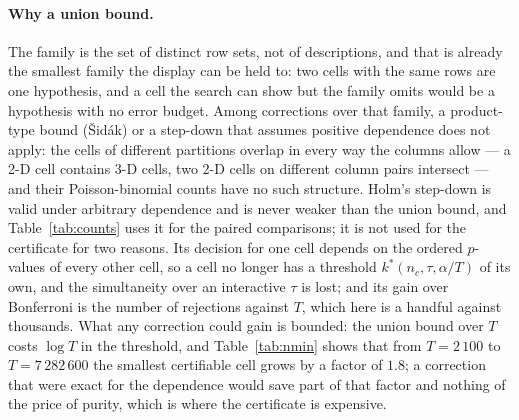 \documentclass[11pt]{article}
\begin{document}
\paragraph{Why a union bound.} The family is the set of distinct row sets, not of descriptions, and that is already the smallest family the display can be held to: two cells with the same rows are one hypothesis, and a cell the search can show but the family omits would be a hypothesis with no error budget. Among corrections over that family, a product-type bound (\v{S}id\'ak) or a step-down that assumes positive dependence does not apply: the cells of different partitions overlap in every way the columns allow --- a 2-D cell contains 3-D cells, two 2-D cells on different column pairs intersect --- and their Poisson-binomial counts have no such structure. Holm's step-down is valid under arbitrary dependence and is never weaker than the union bound, and Table~\ref{tab:counts} uses it for the paired comparisons; it is not used for the certificate for two reasons. Its decision for one cell depends on the ordered $p$-values of every other cell, so a cell no longer has a threshold $k^*(n_c,\tau,\alpha/T)$ of its own, and the simultaneity over an interactive $\tau$ is lost; and its gain over Bonferroni is the number of rejections against $T$, which here is a handful against thousands. What any correction could gain is bounded: the union bound over $T$ costs $\log T$ in the threshold, and Table~\ref{tab:nmin} shows that from $T=2\,100$ to $T=7\,282\,600$ the smallest certifiable cell grows by a factor of $1.8$; a correction that were exact for the dependence would save part of that factor and nothing of the price of purity, which is where the certificate is expensive.
\end{document}
